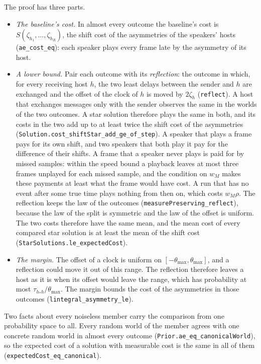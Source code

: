 \documentclass[11pt,a4paper]{article}
\newcommand{\lean}[1]{\texttt{#1}}
\theoremstyle{definition}
\begin{document}
The proof has three parts.
\begin{itemize}
\item \emph{The baseline's cost.} In almost every outcome the baseline's
  cost is $S(\zeta_{h_1}, \dots, \zeta_{h_R})$, the shift cost of the
  asymmetries of the speakers' hosts (\lean{ae\_cost\_eq}): each speaker
  plays every frame late by the asymmetry of its host.
\item \emph{A lower bound.} Pair each outcome with its \emph{reflection}:
  the outcome in which, for every receiving host $h$, the two least delays
  between the sender and $h$ are exchanged and the offset of the clock of
  $h$ is moved by $2\zeta_h$ (\lean{reflect}). A host that exchanges
  messages only with the sender observes the same in the worlds of the two
  outcomes. A star solution therefore plays the same in both, and its costs
  in the two add up to at least twice the shift cost of the asymmetries
  (\lean{Solution.\allowbreak cost\_shiftStar\_add\_ge\_of\_step}). A
  speaker that plays a frame pays for its own shift, and two speakers that
  both play it pay for the difference of their shifts. A frame that a
  speaker never plays is paid for by missed samples: within the speed bound
  a playback leaves at most three frames unplayed for each missed sample,
  and the condition on $w_M$ makes these payments at least what the frame
  would have cost. A run that has no event after some true time plays
  nothing from then on, which costs $w_M \rho$. The
  reflection keeps the law of the outcomes
  (\lean{measurePreserving\_reflect}), because the law of the split is
  symmetric and the law of the offset is uniform. The two costs therefore
  have the same mean, and the mean cost of every compared star solution is
  at least the mean of the shift cost
  (\lean{StarSolutions.\allowbreak le\_expectedCost}).
\item \emph{The margin.} The offset of a clock is uniform on
  $[-\theta_{\max}, \theta_{\max}]$, and a reflection could move it out of
  this range. The reflection therefore leaves a host as it is when its
  offset would leave the range, which has probability at most
  $\tau_{h_* h}/\theta_{\max}$. The margin bounds the cost of the
  asymmetries in those outcomes (\lean{lintegral\_asymmetry\_le}).
\end{itemize}
Two facts about every noiseless member carry the comparison from one
probability space to all. Every random world of the member agrees with one
concrete random world in almost every outcome
(\lean{Prior.\allowbreak ae\_eq\_canonicalWorld}), so the expected cost of a
solution with measurable cost is the same in all of them
(\lean{expectedCost\_eq\_canonical}).
\end{document}
